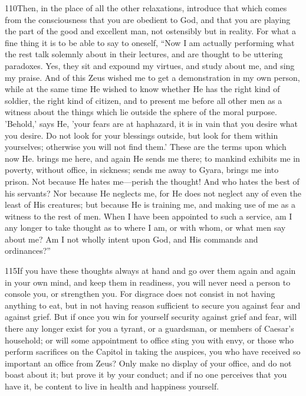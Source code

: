 110Then, in the place of all the other relaxations, introduce that which comes from the consciousness that you are obedient to God, and that you are playing the part of the good and excellent man, not ostensibly but in reality. For what a fine thing it is to be able to say to oneself, ``Now I am actually performing what the rest talk solemnly about in their lectures, and are thought to be uttering paradoxes. Yes, they sit and expound my virtues, and study about me, and sing my praise. And of this Zeus wished me to get a demonstration in my own person, while at the same time He wished to know whether He has the right kind of soldier, the right kind of citizen, and to present me before all other men as a witness about the things which lie outside the sphere of the moral purpose. 'Behold,' says He, 'your fears are at haphazard, it is in vain that you desire what you desire. Do not look for your blessings outside, but look for them within yourselves; otherwise you will not find them.' These are the terms upon which now He. brings me here, and again He sends me there; to mankind exhibits me in poverty, without office, in sickness; sends me away to Gyara, brings me into prison. Not because He hates me—perish the thought! And who hates the best of his servants? Nor because He neglects me, for He does not neglect any of even the least of His creatures; but because He is training me, and making use of me as a witness to the rest of men. When I have been appointed to such a service, am I any longer to take thought as to where I am, or with whom, or what men say about me? Am I not wholly intent upon God, and His commands and ordinances?''

115If you have these thoughts always at hand and go over them again and again in your own mind, and keep them in readiness, you will never need a person to console you, or strengthen you. For disgrace does not consist in not having anything to eat, but in not having reason sufficient to secure you against fear and against grief. But if once you win for yourself security against grief and fear, will there any longer exist for you a tyrant, or a guardsman, or members of Caesar's household; or will some appointment to office sting you with envy, or those who perform sacrifices on the Capitol in taking the auspices, you who have received so important an office from Zeus? Only make no display of your office, and do not boast about it; but prove it by your conduct; and if no one perceives that you have it, be content to live in health and happiness yourself.

